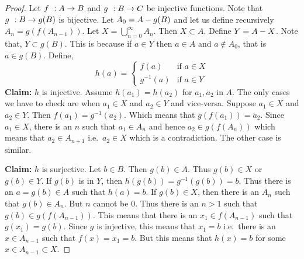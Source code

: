 \begin{proof}
    Let ${f}\hspace{0.05in}:{A}\to{B}$ and ${g}\hspace{0.05in}:{B}\to{C}$ be injective functions. Note that ${g}\hspace{0.05in}:{B}\to{g(B)}$ is bijective.
    Let $A_0 = {A}-{g(B)}$ and let us define recursively $A_n = g(f(A_{n-1}))$.
    Let $X = \bigcup\limits_{n=0}^{\infty}A_n$. Then $X \subset A$. Define $Y = {A}-{X}$. Note that, $Y
    \subset g(B)$. This is because if $a \in Y$ then $a \in A$ and $a \not\in A_0$, that is $a \in g(B)$.
    Define,
    \begin{equation*}
	h(a) = 
	\begin{cases}
	    f(a) &\text{if $a\in X$}\\
	    g^{-1}(a) &\text{if $a\in Y$}
	\end{cases}
    \end{equation*}
    \textbf{Claim:} $h$ is injective. 
    Assume $h(a_1) = h(a_2)$ for $a_1,a_2$ in $A$. The only cases we have to check are when $a_1\in X$ and
    $a_2\in Y$ and vice-versa.
    Suppose $a_1\in X$ and $a_2\in Y$. Then $f(a_1) = g^{-1}(a_2)$. Which means that $g(f(a_1)) = a_2$. Since
    $a_1\in X$, there is an $n$ such that $a_1 \in A_n$ and hence $a_2 \in g(f(A_n))$ which means that $a_2
    \in A_{n+1}$ i.e.~$a_2 \in X$ which is a contradiction. The other case is similar.

    \textbf{Claim:} $h$ is surjective. Let $b \in B$. Then $g(b) \in A$. Thus $g(b) \in X$ or $g(b) \in Y$. If
    $g(b)$ is in $Y$, then $h(g(b)) = g^{-1}(g(b)) = b$. Thus there is an $a = g(b) \in A$ such that $h(a) =
    b$. If $g(b) \in X$, then there is an $A_n$ such that $g(b)\in A_n$. But $n$ cannot be $0$. Thus there is
    an $n > 1$ such that $g(b) \in g(f(A_{n-1}))$. This means that there is an $x_1\in f(A_{n-1})$ such that
    $g(x_1) = g(b)$. Since $g$ is injective, this means that $x_1 = b$ i.e.~there is an $x \in A_{n-1}$ such
    that $f(x) = x_1 = b$. But this means that $h(x) = b$ for some $x \in A_{n-1}\subset X$.
\end{proof}


